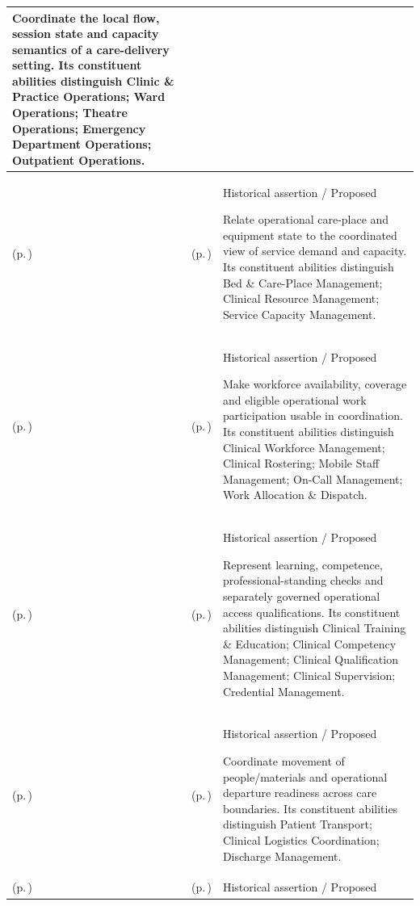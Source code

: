 \begin{longtable}{|>{\raggedright\arraybackslash}p{0.27\TableWidth}|>{\raggedright\arraybackslash}p{0.27\TableWidth}|>{\raggedright\arraybackslash}p{0.46\TableWidth}|}
Coordinate the local flow, session state and capacity semantics of a care-delivery setting. Its constituent abilities distinguish Clinic \& Practice Operations; Ward Operations; Theatre Operations; Emergency Department Operations; Outpatient Operations.\\\hline
\nameref{cap:bec-care-operations-coordination-enablement} (p.\,\pageref{cap:bec-care-operations-coordination-enablement}) & \nameref{cap:bec-care-resource-capacity-coordination} (p.\,\pageref{cap:bec-care-resource-capacity-coordination}) & Historical assertion / Proposed

Relate operational care-place and equipment state to the coordinated view of service demand and capacity. Its constituent abilities distinguish Bed \& Care-Place Management; Clinical Resource Management; Service Capacity Management.\\\hline
\nameref{cap:bec-care-operations-coordination-enablement} (p.\,\pageref{cap:bec-care-operations-coordination-enablement}) & \nameref{cap:bec-operational-workforce-coordination} (p.\,\pageref{cap:bec-operational-workforce-coordination}) & Historical assertion / Proposed

Make workforce availability, coverage and eligible operational work participation usable in coordination. Its constituent abilities distinguish Clinical Workforce Management; Clinical Rostering; Mobile Staff Management; On-Call Management; Work Allocation \& Dispatch.\\\hline
\nameref{cap:bec-care-operations-coordination-enablement} (p.\,\pageref{cap:bec-care-operations-coordination-enablement}) & \nameref{cap:bec-workforce-qualification-development-enablement} (p.\,\pageref{cap:bec-workforce-qualification-development-enablement}) & Historical assertion / Proposed

Represent learning, competence, professional-standing checks and separately governed operational access qualifications. Its constituent abilities distinguish Clinical Training \& Education; Clinical Competency Management; Clinical Qualification Management; Clinical Supervision; Credential Management.\\\hline
\nameref{cap:bec-care-operations-coordination-enablement} (p.\,\pageref{cap:bec-care-operations-coordination-enablement}) & \nameref{cap:bec-care-movement-transition-coordination} (p.\,\pageref{cap:bec-care-movement-transition-coordination}) & Historical assertion / Proposed

Coordinate movement of people/materials and operational departure readiness across care boundaries. Its constituent abilities distinguish Patient Transport; Clinical Logistics Coordination; Discharge Management.\\\hline
\nameref{cap:bec-governed-health-information-enablement} (p.\,\pageref{cap:bec-governed-health-information-enablement}) & \nameref{cap:bec-clinical-information-stewardship-enablement} (p.\,\pageref{cap:bec-clinical-information-stewardship-enablement}) & Historical assertion / Proposed


\end{longtable}
